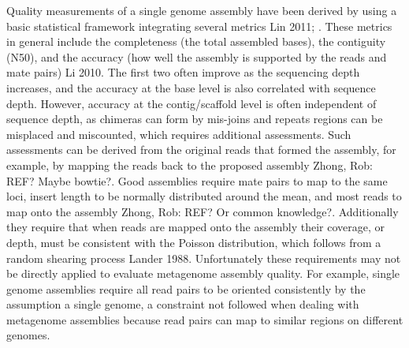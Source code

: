 \documentclass[phd,tocprelim]{cornell}
\begin{document}
Quality measurements of a single genome assembly have been derived by using a basic statistical framework integrating several metrics {Lin 2011; }. These metrics in general include the completeness (the total assembled bases), the contiguity (N50), and the accuracy (how well the assembly is supported by the reads and mate pairs) {Li 2010}. The first two often improve as the sequencing depth increases, and the accuracy at the base level is also correlated with sequence depth. However, accuracy at the contig/scaffold level is often independent of sequence depth, as chimeras can form by mis-joins and repeats regions can be misplaced and miscounted, which requires additional assessments. Such assessments can be derived from the original reads that formed the assembly, for example, by mapping the reads back to the proposed assembly {Zhong, Rob: REF? Maybe bowtie?}. Good assemblies require mate pairs to map to the same loci, insert length to be normally distributed around the mean, and most reads to map onto the assembly {Zhong, Rob: REF? Or common knowledge?}. Additionally they require that when reads are mapped onto the assembly their coverage, or depth, must be consistent with the Poisson distribution, which follows from a random shearing process {Lander 1988}. Unfortunately these requirements may not be directly applied to evaluate metagenome assembly quality. For example, single genome assemblies require all read pairs to be oriented consistently by the assumption a single genome, a constraint not followed when dealing with metagenome assemblies because read pairs can map to similar regions on different genomes.
\end{document}
